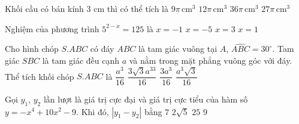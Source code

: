 \begin{ex}%
Khối cầu có bán kính $3$ cm thì có thể tích là
\choice
{$9\pi\,\mathrm{cm}^3$}
{$12\pi\,\mathrm{cm}^3$}
{\True $36\pi\,\mathrm{cm}^3$}
{$27\pi\,\mathrm{cm}^3$}
\end{ex}

\begin{ex}%
Nghiệm của phương trình $5^{2-x}=125$ là
\choice
{\True $x=-1$}
{$x=-5$}
{$x=3$}
{$x=1$}
\end{ex}

\begin{ex}%
Cho hình chóp $S.ABC$ có đáy $ABC$ là tam giác vuông tại $A$, $\widehat{ABC}=30^\circ$. Tam giác $SBC$ là tam giác đều cạnh $a$ và nằm trong mặt phẳng vuông góc với đáy. Thể tích khối chóp $S.ABC$ là
\choice
{\True $\dfrac{a^3}{16}$}
{$\dfrac{3\sqrt{3}a^33}{16}$}
{$\dfrac{3a^3}{16}$}
{$\dfrac{a^3\sqrt{3}}{16}$}
\end{ex}

\begin{ex}%
Gọi $y_1$, $y_2$ lần lượt là giá trị cực đại và giá trị cực tiểu của hàm số $y=-x^4+10x^2-9$. Khi đó, $|y_1-y_2|$ bằng
\choice
{$7$}
{$2\sqrt{5}$}
{\True $25$}
{$9$}
\end{ex}

